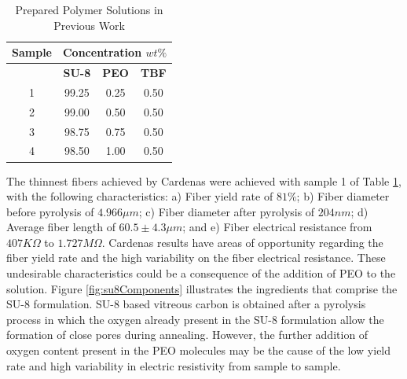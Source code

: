 \begin{table}[!th]
\centering
\caption[Prepared Polymer Solutions in Previous Work]{Prepared Polymer Solutions in Previous Work \cite{Cardenas2017, Flores2017}}
\begin{tabular}{cccc}
\hline
\textbf{Sample} & \multicolumn{3}{c}{\textbf{Concentration} $wt\%$} \\
\hline
{} & \textbf{SU-8} & \textbf{PEO} & \textbf{TBF} \\
1  & 99.25         & 0.25         & 0.50         \\
2  & 99.00         & 0.50         & 0.50         \\
3  & 98.75         & 0.75         & 0.50         \\
4  & 98.50         & 1.00         & 0.50         \\
\hline
\end{tabular}
\label{tab:previousPreparedPolymerSolutions}
\end{table}

The thinnest fibers achieved by Cardenas \cite{Cardenas2017} were achieved with sample 1 of Table \ref{tab:previousPreparedPolymerSolutions}, with the following characteristics: a) Fiber yield rate of $81\%$; b) Fiber diameter before pyrolysis of $4.966 \mu m$; c) Fiber diameter after pyrolysis of $204 nm$; d) Average fiber length of $60.5 ± 4.3 \mu m$; and e) Fiber electrical resistance from $407 K \Omega$ to $1.727 M \Omega$. Cardenas results have areas of opportunity regarding the fiber yield rate and the high variability on the fiber electrical resistance. These undesirable characteristics could be a consequence of the addition of PEO to the solution. Figure \ref{fig:su8Components} illustrates the ingredients that comprise the SU-8 formulation. SU-8 based vitreous carbon is obtained after a pyrolysis process in which the oxygen already present in the SU-8 formulation allow the formation of close pores during annealing. However, the further addition of oxygen content present in the PEO molecules may be the cause of the low yield rate and high variability in electric resistivity from sample to sample.

